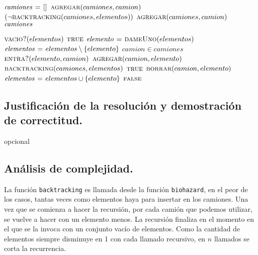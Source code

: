\begin{codebox}
\li $\id{camiones} \gets []$
\li $\textnormal{\scshape agregar}(camiones, camion)$
\li \While $(\neg\textnormal{\scshape backtracking}(camiones, elementos))$
\li     \Do
            $\textnormal{\scshape agregar}(camiones, camion)$
        \End
\li \Return $\id{camiones}$
\end{codebox}


\vspace*{0.5cm} 


\begin{codebox}
\li \If $\textnormal{\scshape vacio?}(elementos)$
\li     \Then
            \Return $\textnormal{\scshape true}$
        \End
\li $\id{elemento} \gets \proc{dameUno}(elementos)$
\li $\id{elementos} \gets elementos \setminus \{elemento\}$
\li \For $camion \in camiones$
\li     \Do
            \If $\textnormal{\scshape entra?}(elemento, camion)$
\li             \Then
                    $\textnormal{\scshape agregar}(camion, elemento)$
\li                 \If $\textnormal{\scshape backtracking}(camiones, elementos)$
                        \Then
\li                         \Return $\textnormal{\scshape true}$
\li                 \Else
\li                     $\textnormal{\scshape borrar}(camion, elemento)$
                    \End    
            \End
        \End
\li $\id{elementos} \gets elementos \cup \{elemento\}$
\li \Return $\textnormal{\scshape false}$
\end{codebox}



\subsection{Justificación de la resolución y demostración de correctitud.}

\vspace*{0.3cm}


opcional


\vspace*{0.75cm} \noindent



\subsection{Análisis de complejidad.}

\vspace*{0.3cm}


La función \verb|backtracking| es llamada desde la función \verb|biohazard|, en
el peor de los casos, tantas veces como elementos haya para insertar en los camiones.
Una vez que se comienza a hacer la recursión, por cada camión que podemos utilizar,
se vuelve a hacer con un elemento menos. La recursión finaliza en el momento en 
el que se la invoca con un conjunto vacío de elementos. Como la cantidad de 
elementos siempre disminuye en 1 con cada llamado recursivo, en $n$ llamados se
corta la recurrencia.

